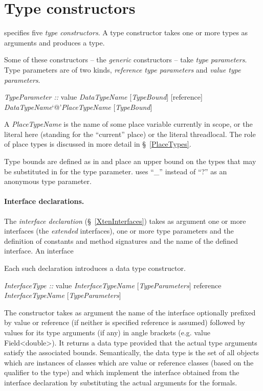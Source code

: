 \section{Type constructors}\label{TypeConstructors}

{}\Xten{} specifies five {\em type constructors}.  A type constructor
takes one or more types as arguments and produces a type.

Some of these constructors -- the {\em generic} constructors -- take
{\em type parameters}\label{TypeParameter}. Type
parameters are of two kinds, {\em reference type
parameters} and {\em value type
parameters}.

\begin{x10}
{\em TypeParameter ::}
  value {\em{}DataTypeName} [{\em{}TypeBound}]
  [reference] {\em{}DataTypeName}`@'{\em{}PlaceTypeName} 
               [{\em{}TypeBound}]
\end{x10}

\noindent A {\cf\em PlaceTypeName} is the name of some place
variable currently in scope, or the literal {\cf here} (standing for the
``current'' place) or the literal {\cf threadlocal}. The role of place types is discussed in  more detail in \S~\ref{PlaceTypes}.

Type bounds are defined as in \java{} \cite{gjspec} and place an upper
bound on the types that may be substituted in for the type
parameter. \Xten{} uses ``\_'' instead of ``?'' as an anonymous type
parameter.


\paragraph{Interface declarations.}
The {\em interface declaration} (\S~\ref{XtenInterfaces}) takes as
argument one or more interfaces (the {\em extended} interfaces), one
or more type parameters and the definition of constants and method
signatures and the name of the defined interface. An interface

Each such declaration introduces a data type constructor.
\begin{x10}
{\em InterfaceType ::}
  value {\em{}InterfaceTypeName} [{\em{}TypeParameters}]
  reference {\em{}InterfaceTypeName} [{\em{}TypeParameters}]
\end{x10}

The constructor takes as argument the name of the interface optionally
prefixed by {\cf value} or {\cf reference} (if neither is specified
{\cf reference} is assumed) followed by values for its type arguments
(if any) in angle brackets (e.g.{} {\cf value Field<double>}).  It
returns a data type provided that the actual type arguments satisfy
the associated bounds.  Semantically, the data type is the set of all
objects which are instances of classes which are value or reference
classes (based on the qualifier to the type) and which implement the
interface obtained from the interface declaration by substituting the
actual arguments for the formals.

